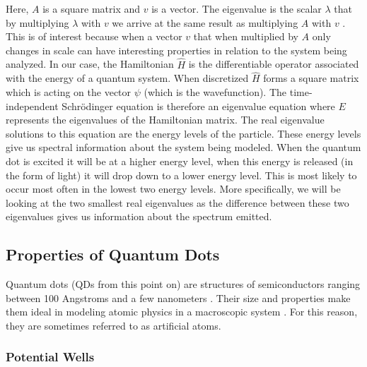 \documentclass[authoryearcitations]{UoYCSproject}
\begin{document}
Here, $A$ is a square matrix and $v$ is a vector. The eigenvalue is the scalar $\lambda$ that by multiplying 
$\lambda$ with $v$ we arrive at the same result as multiplying $A$ with $v$ \cite{Hamming}. This is of interest
because when a vector $v$ that when multiplied by $A$ only changes in scale can have interesting properties in relation
to the system being analyzed. In our case, the Hamiltonian $\hat{H}$ is the differentiable operator associated with 
the energy of a quantum system. When discretized $\hat{H}$ forms a square matrix which is acting on the vector $\psi$
(which is the wavefunction). The time-independent Schr\"{o}dinger equation is therefore an eigenvalue equation where
$E$ represents the eigenvalues of the Hamiltonian matrix.  
The real eigenvalue solutions to this equation are the energy levels
of the particle. These energy levels give us spectral information about the system being modeled. When the quantum 
dot is excited it will be at a higher energy level, when this energy is released (in the form of light) it will drop 
down to a lower energy level. This is most likely to occur most often in the lowest two energy levels. More specifically,
we will be looking at the two smallest real eigenvalues as the difference between these two
eigenvalues gives us information about the spectrum emitted. 





\subsection{Properties of Quantum Dots}
Quantum dots (QDs from this point on) are structures of semiconductors ranging between 100 Angstroms and 
a few nanometers \cite{dots}. Their size and properties make them ideal in modeling atomic physics in a
macroscopic system \cite{Li}. For this reason, they are sometimes referred to as artificial atoms.

\subsubsection{Potential Wells}
\end{document}
